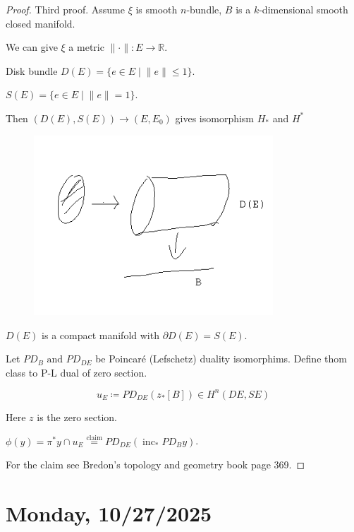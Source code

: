 \documentclass{article}
\theoremstyle{definition}
\begin{document}
    \begin{proof}
        Third proof. Assume \(\xi\) is smooth \(n\)-bundle, \(B\) is a \(k\)-dimensional smooth closed manifold. 

        We can give \(\xi\) a metric \(\lVert \cdot \rVert : E \to \mathbb{R}\).

        Disk bundle \(D(E) = \{ e\in E \mid \lVert e \rVert \leq 1 \}\).

        \(S(E) = \{ e\in E \mid \lVert e \rVert = 1 \}\).

        Then \((D(E), S(E)) \to (E,E_0)\) gives isomorphism \(H_{\ast}\) and \(H^{\ast}\)
        
        \begin{figure}[H]
            \centering
            \includegraphics[width=0.8\textwidth]{img/DESE_example}
        \end{figure}

        \(D(E)\) is a compact manifold with \(\partial D(E) = S(E)\).

        Let \(PD_B \text{ and } PD_{DE}\) be Poincar\'e (Lefschetz) duality isomorphims. Define thom class to P-L dual of zero section.
        
        \[
            u_E \coloneqq PD_{DE} (z_{\ast} [B]) \in H^n (DE, SE)
        \]

        Here \(z\) is the zero section.

        \(\phi(y) = \pi^{\ast} y \cap u_E \overset{\text{claim}}{=} PD_{DE} (\operatorname{inc}_{\ast} PD_B y)\).

        For the claim see Bredon's topology and geometry book page 369.

    \end{proof}

    \section*{Monday, 10/27/2025}
    
\end{document}

